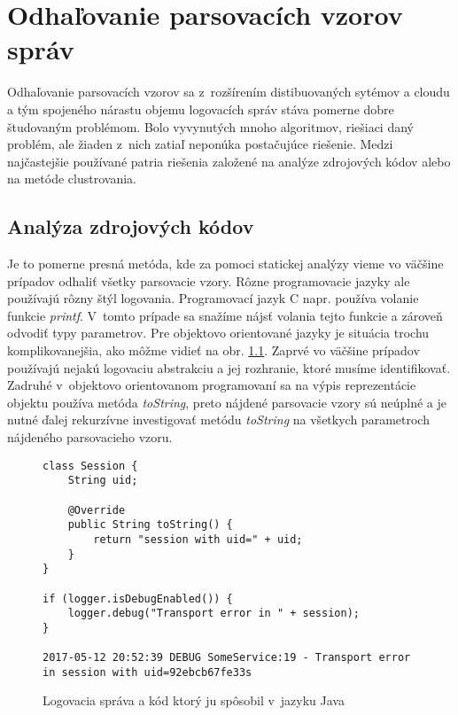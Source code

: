 \chapter{Odhaľovanie parsovacích vzorov správ}

Odhaľovanie parsovacích vzorov sa z~rozšírením distibuovaných sytémov a cloudu a tým spojeného nárastu objemu logovacích správ stáva pomerne dobre študovaným problémom. Bolo vyvynutých mnoho algoritmov, riešiaci daný problém, ale žiaden z~nich zatiaľ neponúka postačujúce riešenie. Medzi najčastejšie používané patria riešenia založené na analýze zdrojových kódov alebo na metóde clustrovania.

\section{Analýza zdrojových kódov}

Je to pomerne presná metóda, kde za pomoci statickej analýzy vieme vo väčšine prípadov odhaliť všetky parsovacie vzory.
Rôzne programovacie jazyky ale používajú rôzny štýl logovania. Programovací jazyk C napr. používa volanie funkcie \emph{printf}.
V~tomto prípade sa snažíme nájsť volania tejto funkcie a zároveň odvodiť typy parametrov.
Pre objektovo orientované jazyky je situácia trochu komplikovanejšia, ako môžme vidieť na obr. \ref{fig:static}. Zaprvé vo väčšine prípadov používajú nejakú logovaciu abstrakciu a jej rozhranie, ktoré musíme identifikovať. Zadruhé v~objektovo orientovanom programovaní sa na výpis reprezentácie objektu používa metóda \emph{toString}, preto nájdené parsovacie vzory sú neúplné a je nutné ďalej rekurzívne investigovať metódu \emph{toString} na všetkych parametroch nájdeného parsovacieho vzoru.

\begin{figure}[htbp]
\centering
\begin{minipage}{0.9\textwidth}
\lstset{tabsize=4,columns=flexible,breaklines=true,breakatwhitespace=true, showstringspaces=false}
\begin{lstlisting}
class Session {
	String uid;
	
	@Override
	public String toString() {
		return "session with uid=" + uid;
	}
}

if (logger.isDebugEnabled()) {
	logger.debug("Transport error in " + session);
}

2017-05-12 20:52:39 DEBUG SomeService:19 - Transport error in session with uid=92ebcb67fe33s
\end{lstlisting} 		
\end{minipage}
\caption{Logovacia správa a kód ktorý ju spôsobil v~jazyku Java}
\label{fig:static} 
\end{figure}

